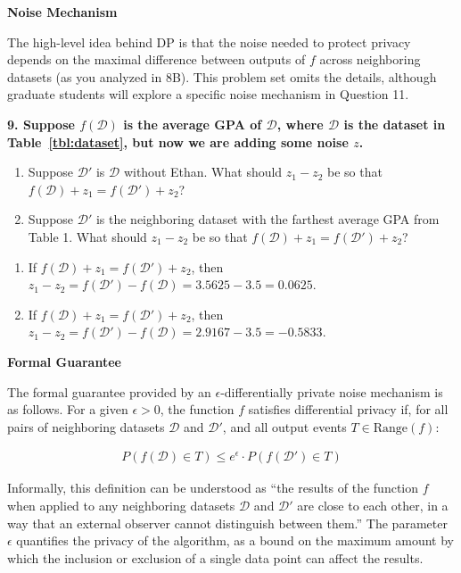 \documentclass{article}
\begin{document}
\textbf{Noise Mechanism}

The high-level idea behind DP is that the noise needed to protect privacy depends on the maximal difference between outputs of $f$ across neighboring datasets (as you analyzed in 8B). This problem set omits the details, although graduate students will explore a specific noise mechanism in Question 11.

\textbf{9. Suppose $f(\mathcal{D})$ is the average GPA of $\mathcal{D}$, where $\mathcal{D}$ is the dataset in Table~\ref{tbl:dataset}, but now we are adding some noise $z$.}
\begin{enumerate}[label=\Alph*.]
\item Suppose $\mathcal{D}'$ is $\mathcal{D}$  without Ethan. What should $z_1 - z_2$ be so that $f(\mathcal{D}) + z_1 = f(\mathcal{D'}) + z_2$?
\item Suppose $\mathcal{D'}$ is the neighboring dataset with the farthest average GPA from Table 1. What should $z_1 - z_2$ be so that $f(\mathcal{D}) + z_1 = f(\mathcal{D'}) + z_2$?
\end{enumerate}

\bigskip
\begin{mdframed}
\begin{enumerate}[label=\Alph*.]
\item If $f(\mathcal{D}) + z_1 = f(\mathcal{D'}) + z_2$, then $z_1 - z_2 = f(\mathcal{D'}) - f(\mathcal{D}) = 3.5625 - 3.5 = 0.0625$.
\item If $f(\mathcal{D}) + z_1 = f(\mathcal{D'}) + z_2$, then $z_1 - z_2 = f(\mathcal{D'}) - f(\mathcal{D}) = 2.9167 - 3.5 = -0.5833$.
\end{enumerate}
\end{mdframed}
\bigskip



\textbf{Formal Guarantee}

The formal guarantee provided by an $\epsilon$-differentially private noise mechanism is as follows. For a given $\epsilon>0$, the function $f$ satisfies differential privacy if, for all pairs of neighboring datasets $\mathcal{D}$ and $\mathcal{D}'$, and all output events $T \in \text{Range}(f)$:

\begin{align*}
    \label{eq:DP_Def}
    P(f(\mathcal{D}) \in T) \leq e^{\epsilon} \cdot P(f(\mathcal{D}') \in T)
\end{align*}

Informally, this definition can be understood as ``the results of the function $f$ when applied to any neighboring datasets $\mathcal{D}$ and $\mathcal{D}'$ are close to each other, in a way that an external observer cannot distinguish between them.'' The parameter $\epsilon$ quantifies the privacy of the algorithm, as a bound on the maximum amount by which the inclusion or exclusion of a single data point can affect the results.
\end{document}
